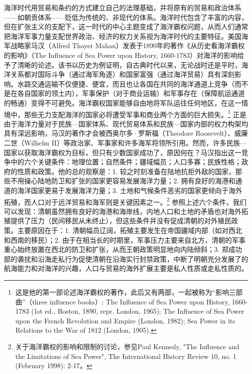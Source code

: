 \documentclass[a4paper, 12pt, openright]{ctexbook}
\begin{document}
海洋时代用贸易和条约的方式建立自己的法理基础，并将原有的贸易和政治体系——如朝贡体系——贬低为传统的、非现代的体系。海洋时代包含了丰富的内容，但在扩张主义的支配下，这一时代的中心主题变成了海洋霸权问题，从而人们通常把海洋军事力量支配世界政治、经济的权力关系视为海洋时代的主要特征。美国海军战略家马汉（Alfred Thayer Mahan）发表于1890年的著作《从历史看海洋霸权的影响》（The Influence of Sea Power upon History, 1660-1783）对海洋的影响给予了清晰的论述。该书以历史为例证明，自古典时代以来，无论战时还是平时，海洋关系都对国际斗争（通过海军角逐）和国家富强（通过海洋贸易）具有深刻影响。水路交通运输不仅便捷、便宜，而且也让各国在共同的海洋通道上竞争（而不是在各自国家的领土内），军事保护（对于商业运输）和军事存在（保障航运通道的畅通）变得不可避免。海洋霸权国家能够自由地将军队运往任何地区，在这一情境中，那些无力支配海洋的国家必将遭受军事和商业两个方面的巨大损失。\footnote{这是他的第一部论述海洋霸权的著作，此后又有两部，一起被称为“影响三部曲”（three influence books）: The Influence of Sea Power upon History, 1660-1783 (1st ed., Boston, 1890, repr. London, 1965); The Influence of Sea Power upon the French Revolution and Empire (London, 1982); Sea Power in its Relations to the War of 1812 (London, 1905).} 正是由于海洋力量对于民族—国家体系、现代贸易体系和民族—国家内部的权力构架均具有深远影响，马汉的著作才会被西奥尔多·罗斯福（Theodore Roosevelt）、威廉二世（Wilhelm II）等政治家、军事家和许多海军将领所引用。然而，许多民族—国家以获取海洋霸权为目标，但只有少数国家成功了，原因何在？马汉指出这一竞争中的六个关键条件：地理位置；自然条件；疆域幅员；人口多寡；民族性格；政府的性质和政策。他的总的观察是：1. 较之时刻准备在陆地抗拒外敌的国家，那些不用操心陆地防卫和扩张的国家更容易发展海洋力量；2. 拥有良好的海港和通道的海洋国家更易于发展海洋力量；3. 土地和气候条件恶劣的国家更倾向于海外拓殖，而人口对于远洋贸易和海军则是关键因素之一。\footnote{关于海洋霸权的影响和限制的讨论，参见Paul Kennedy, "The Influence and the Limitations of Sea Power", The International History Review 10, no. 1 (February 1998): 2-17。} 参照上述六个条件，我们可以发现：清朝虽然拥有良好的海港和海岸线，内地人口和土地的矛盾也对海外拓殖提供了压力（民间移民从未终止），但这些条件并没有促成清朝的对外殖民政策。主要原因在于：1. 清朝幅员辽阔，拓殖主要发生在帝国疆域内部（如对西北和西南的移民）；2. 由于在相当长的时期里，军事压力主要来自北方，清朝的军事重心始终放置在西北的防卫和扩张，从而王朝政策明显地向内陆倾斜；3. 郑成功部的袭扰和沿海走私行为促使清朝在沿海实行封禁政策，中断了明朝充分发展了的航海能力和对海洋的兴趣，人口与贸易的海外扩展主要是私人性质或走私性质的。
\end{document}
